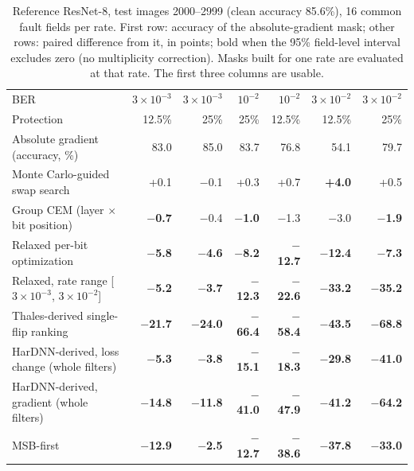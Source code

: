 \begin{table}[h]
\caption{Reference ResNet-8, test images 2000--2999 (clean accuracy 85.6\%), 16 common fault fields per rate. First row: accuracy of the absolute-gradient mask; other rows: paired difference from it, in points; bold when the 95\% field-level interval excludes zero (no multiplicity correction). Masks built for one rate are evaluated at that rate. The first three columns are usable.}\label{tab:search}
\centering\footnotesize\setlength{\tabcolsep}{4pt}
\begin{tabular}{l r r r r r r}\toprule
BER & $3\!\times\!10^{-3}$ & $3\!\times\!10^{-3}$ & $10^{-2}$ & $10^{-2}$ & $3\!\times\!10^{-2}$ & $3\!\times\!10^{-2}$\\
Protection & 12.5\% & 25\% & 25\% & 12.5\% & 12.5\% & 25\%\\\midrule
Absolute gradient (accuracy, \%) & 83.0 & 85.0 & 83.7 & 76.8 & 54.1 & 79.7\\
Monte Carlo-guided swap search & +0.1 & $-$0.1 & +0.3 & +0.7 & \textbf{+4.0} & +0.5\\
Group CEM (layer $\times$ bit position) & \textbf{$-$0.7} & $-$0.4 & \textbf{$-$1.0} & $-$1.3 & $-$3.0 & \textbf{$-$1.9}\\
Relaxed per-bit optimization & \textbf{$-$5.8} & \textbf{$-$4.6} & \textbf{$-$8.2} & \textbf{$-$12.7} & \textbf{$-$12.4} & \textbf{$-$7.3}\\
Relaxed, rate range [$3\!\times\!10^{-3}$, $3\!\times\!10^{-2}$] & \textbf{$-$5.2} & \textbf{$-$3.7} & \textbf{$-$12.3} & \textbf{$-$22.6} & \textbf{$-$33.2} & \textbf{$-$35.2}\\
Thales-derived single-flip ranking & \textbf{$-$21.7} & \textbf{$-$24.0} & \textbf{$-$66.4} & \textbf{$-$58.4} & \textbf{$-$43.5} & \textbf{$-$68.8}\\
HarDNN-derived, loss change (whole filters) & \textbf{$-$5.3} & \textbf{$-$3.8} & \textbf{$-$15.1} & \textbf{$-$18.3} & \textbf{$-$29.8} & \textbf{$-$41.0}\\
HarDNN-derived, gradient (whole filters) & \textbf{$-$14.8} & \textbf{$-$11.8} & \textbf{$-$41.0} & \textbf{$-$47.9} & \textbf{$-$41.2} & \textbf{$-$64.2}\\
MSB-first & \textbf{$-$12.9} & \textbf{$-$2.5} & \textbf{$-$12.7} & \textbf{$-$38.6} & \textbf{$-$37.8} & \textbf{$-$33.0}\\\bottomrule
\end{tabular}
\end{table}


